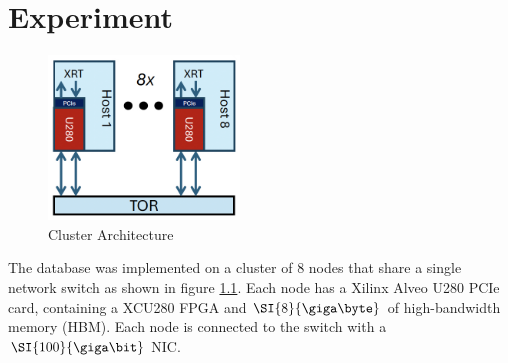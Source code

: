\chapter{Experiment}

\begin{figure}
	\centering
	\includegraphics[width=2in]{oct-arch.jpg}
	\caption{Cluster Architecture}
	\label{oct-arch}
\end{figure}

The database was implemented on a cluster of 8 nodes that share a single network switch as shown in figure \ref{oct-arch}. Each node has a Xilinx Alveo U280 PCIe card, containing a XCU280 FPGA and $\SI{8}{\giga\byte}$ of high-bandwidth memory (HBM). Each node is connected to the switch with a $\SI{100}{\giga\bit}$ NIC.
